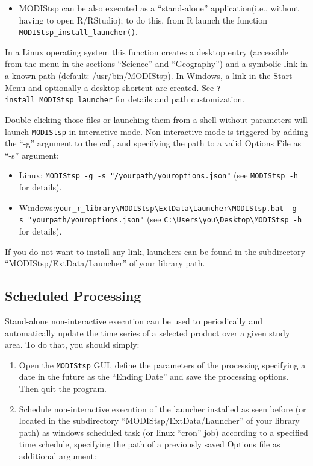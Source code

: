 \documentclass[]{article}
\providecommand{\tightlist}{%
  \setlength{\itemsep}{0pt}\setlength{\parskip}{0pt}}
\begin{document}
\begin{itemize}
\tightlist
\item
  MODIStsp can be also executed as a ``stand-alone'' application(i.e.,
  without having to open R/RStudio); to do this, from R launch the
  function \texttt{MODIStsp\_install\_launcher()}.
\end{itemize}

In a Linux operating system this function creates a desktop entry
(accessible from the menu in the sections ``Science'' and ``Geography'')
and a symbolic link in a known path (default: /usr/bin/MODIStsp). In
Windows, a link in the Start Menu and optionally a desktop shortcut are
created. See \texttt{?install\_MODIStsp\_launcher} for details and path
customization.

Double-clicking those files or launching them from a shell without
parameters will launch \texttt{MODIStsp} in interactive mode.
Non-interactive mode is triggered by adding the ``-g'' argument to the
call, and specifying the path to a valid Options File as ``-s''
argument:

\begin{itemize}
\item
  Linux: \texttt{MODIStsp\ -g\ -s\ "/yourpath/youroptions.json"} (see
  \texttt{MODIStsp\ -h} for details).
\item
  Windows:\texttt{your\_r\_library\textbackslash{}MODIStsp\textbackslash{}ExtData\textbackslash{}Launcher\textbackslash{}MODIStsp.bat\ -g\ -s\ "yourpath/youroptions.json"}
  (see
  \texttt{C:\textbackslash{}Users\textbackslash{}you\textbackslash{}Desktop\textbackslash{}MODIStsp\ -h}
  for details).
\end{itemize}

If you do not want to install any link, launchers can be found in the
subdirectory ``MODIStsp/ExtData/Launcher'' of your library path.

\subsection{Scheduled Processing}\label{scheduled-processing}

Stand-alone non-interactive execution can be used to periodically and
automatically update the time series of a selected product over a given
study area. To do that, you should simply:

\begin{enumerate}
\def\labelenumi{\arabic{enumi}.}
\item
  Open the \texttt{MODIStsp} GUI, define the parameters of the
  processing specifying a date in the future as the ``Ending Date'' and
  save the processing options. Then quit the program.
\item
  Schedule non-interactive execution of the launcher installed as seen
  before (or located in the subdirectory ``MODIStsp/ExtData/Launcher''
  of your library path) as windows scheduled task (or linux ``cron''
  job) according to a specified time schedule, specifying the path of a
  previously saved Options file as additional argument:
\end{enumerate}
\end{document}
